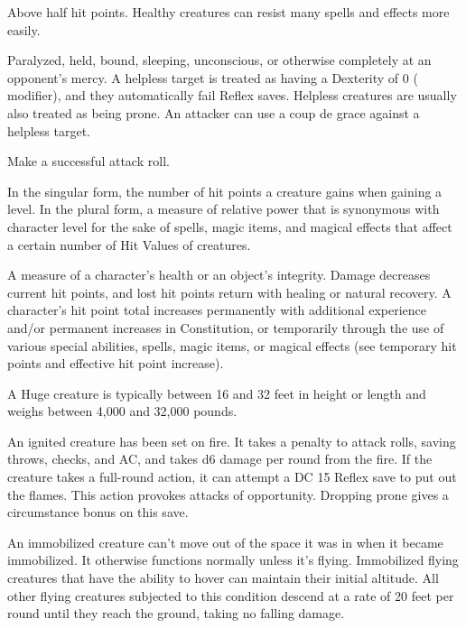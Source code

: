  Above half hit points. Healthy creatures can resist many spells and effects more easily.

 Paralyzed,  held, bound, sleeping, unconscious, or otherwise completely at an opponent's mercy. A helpless target is 
treated as having a Dexterity of 0 ( modifier), and they automatically fail Reflex saves. Helpless creatures are usually also treated as being prone. An attacker can use a coup de grace against a helpless target. 

 Make a successful attack roll. 

 In the singular form, the number of hit points a creature gains when gaining a level. In the plural form, a measure of relative power that is 
synonymous with character level for the sake of spells, magic items, 
and magical effects that affect a certain number of Hit Values of 
creatures. 

 A measure of a character's health or an object's 
integrity. Damage decreases current hit points, and lost hit points 
return with healing or natural recovery. A character's hit point total 
increases permanently with additional experience and/or permanent increases in Constitution, or temporarily through the use of 
various special abilities, spells, magic items, or magical effects (see 
temporary hit points and effective hit point increase). 

 A Huge creature is typically between 16 and 32 feet in 
height or length and weighs between 4,000 and 32,000 pounds. 


 An ignited creature has been set on fire. It takes a  penalty to attack rolls, saving throws, checks, and AC, and takes d6 damage per round from the fire. If the creature takes a full-round action, it can attempt a DC 15 Reflex save to put out the flames. This action provokes attacks of opportunity. Dropping prone gives a  circumstance bonus on this save. 

 An immobilized creature can't move out 
of the space it was in when it became immobilized. It otherwise functions normally unless it's flying. Immobilized flying creatures that have the ability to hover can maintain 
their initial altitude. All other flying creatures subjected 
to this condition descend at a rate of 20 feet per round until 
they reach the ground, taking no falling damage.


